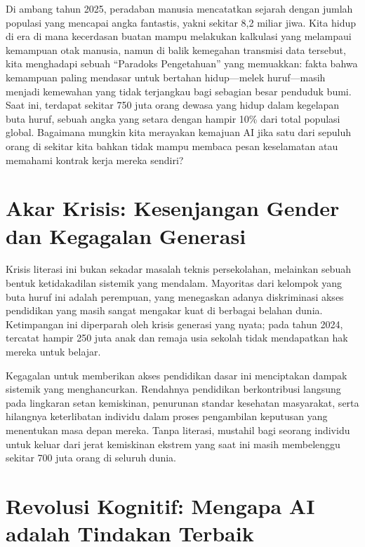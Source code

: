 \documentclass[
  letterpaper,
  DIV=11,
  numbers=noendperiod]{scrreprt}
\begin{document}
Di ambang tahun 2025, peradaban manusia mencatatkan sejarah dengan
jumlah populasi yang mencapai angka fantastis, yakni sekitar 8,2 miliar
jiwa. Kita hidup di era di mana kecerdasan buatan mampu melakukan
kalkulasi yang melampaui kemampuan otak manusia, namun di balik
kemegahan transmisi data tersebut, kita menghadapi sebuah ``Paradoks
Pengetahuan'' yang memuakkan: fakta bahwa kemampuan paling mendasar
untuk bertahan hidup---melek huruf---masih menjadi kemewahan yang tidak
terjangkau bagi sebagian besar penduduk bumi. Saat ini, terdapat sekitar
750 juta orang dewasa yang hidup dalam kegelapan buta huruf, sebuah
angka yang setara dengan hampir 10\% dari total populasi global.
Bagaimana mungkin kita merayakan kemajuan AI jika satu dari sepuluh
orang di sekitar kita bahkan tidak mampu membaca pesan keselamatan atau
memahami kontrak kerja mereka sendiri?

\section{Akar Krisis: Kesenjangan Gender dan Kegagalan
Generasi}\label{akar-krisis-kesenjangan-gender-dan-kegagalan-generasi}

Krisis literasi ini bukan sekadar masalah teknis persekolahan, melainkan
sebuah bentuk ketidakadilan sistemik yang mendalam. Mayoritas dari
kelompok yang buta huruf ini adalah perempuan, yang menegaskan adanya
diskriminasi akses pendidikan yang masih sangat mengakar kuat di
berbagai belahan dunia. Ketimpangan ini diperparah oleh krisis generasi
yang nyata; pada tahun 2024, tercatat hampir 250 juta anak dan remaja
usia sekolah tidak mendapatkan hak mereka untuk belajar.

Kegagalan untuk memberikan akses pendidikan dasar ini menciptakan dampak
sistemik yang menghancurkan. Rendahnya pendidikan berkontribusi langsung
pada lingkaran setan kemiskinan, penurunan standar kesehatan masyarakat,
serta hilangnya keterlibatan individu dalam proses pengambilan keputusan
yang menentukan masa depan mereka. Tanpa literasi, mustahil bagi seorang
individu untuk keluar dari jerat kemiskinan ekstrem yang saat ini masih
membelenggu sekitar 700 juta orang di seluruh dunia.

\section{Revolusi Kognitif: Mengapa AI adalah Tindakan
Terbaik}\label{revolusi-kognitif-mengapa-ai-adalah-tindakan-terbaik}
\end{document}
